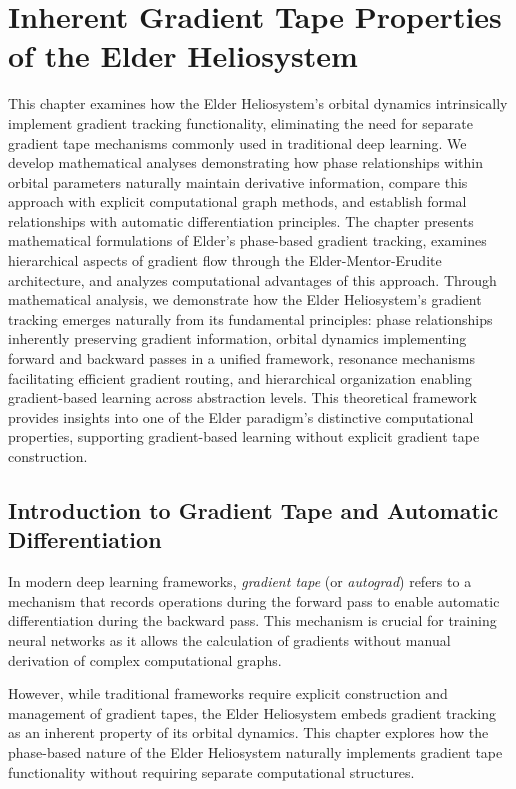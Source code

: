 \chapter{Inherent Gradient Tape Properties of the Elder Heliosystem}

\begin{tcolorbox}[colback=DarkSkyBlue!5!white,colframe=DarkSkyBlue!75!black,title=Chapter Summary]
This chapter examines how the Elder Heliosystem's orbital dynamics intrinsically implement gradient tracking functionality, eliminating the need for separate gradient tape mechanisms commonly used in traditional deep learning. We develop mathematical analyses demonstrating how phase relationships within orbital parameters naturally maintain derivative information, compare this approach with explicit computational graph methods, and establish formal relationships with automatic differentiation principles. The chapter presents mathematical formulations of Elder's phase-based gradient tracking, examines hierarchical aspects of gradient flow through the Elder-Mentor-Erudite architecture, and analyzes computational advantages of this approach. Through mathematical analysis, we demonstrate how the Elder Heliosystem's gradient tracking emerges naturally from its fundamental principles: phase relationships inherently preserving gradient information, orbital dynamics implementing forward and backward passes in a unified framework, resonance mechanisms facilitating efficient gradient routing, and hierarchical organization enabling gradient-based learning across abstraction levels. This theoretical framework provides insights into one of the Elder paradigm's distinctive computational properties, supporting gradient-based learning without explicit gradient tape construction.
\end{tcolorbox}

\section{Introduction to Gradient Tape and Automatic Differentiation}

In modern deep learning frameworks, \textit{gradient tape} (or \textit{autograd}) refers to a mechanism that records operations during the forward pass to enable automatic differentiation during the backward pass. This mechanism is crucial for training neural networks as it allows the calculation of gradients without manual derivation of complex computational graphs.

However, while traditional frameworks require explicit construction and management of gradient tapes, the Elder Heliosystem embeds gradient tracking as an inherent property of its orbital dynamics. This chapter explores how the phase-based nature of the Elder Heliosystem naturally implements gradient tape functionality without requiring separate computational structures.

